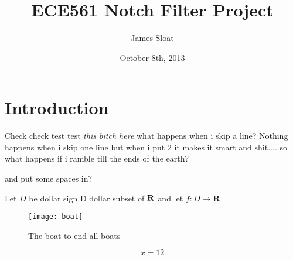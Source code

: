 \documentclass[12pt, titlepage]{article}
\author{James Sloat}
\title{ECE561 Notch Filter Project}
\date{October 8th, 2013}
\begin{document}
\maketitle

\section{Introduction}

Check check test test \emph{this bitch here}
what happens when i skip a line? Nothing happens when i skip one line but when i put 2 it makes it smart and shit.... so what happens if i ramble till the ends of the earth?

and put some spaces in?

Let $D$ be dollar sign D dollar subset of $\bf R$ and let $f \colon D \to \mathbf{R}$

\begin{figure}[h]
\centering
\texttt{[image: boat]}
\caption{The boat to end all boats}
\label{figure:boat}
\end{figure}
\begin{equation}
x = 12
\end{equation}
\end{document}

